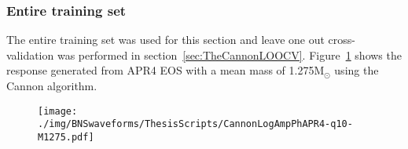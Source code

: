 \subsubsection{Entire training set}
\label{sec:TheCannonEntireTrainingSet}
The entire training set was used for this section and leave one out cross-validation was performed in section~\ref{sec:TheCannonLOOCV}. Figure~\ref{fig:CannonLogAmpPhAPR4-q10-M1275} shows the response generated from APR4 EOS with a mean mass of 1.275M$_\odot$ using the Cannon algorithm.
\begin{figure}[H]
	\texttt{[image: ./img/BNSwaveforms/ThesisScripts/CannonLogAmpPhAPR4-q10-M1275.pdf]} 
	\caption[\protect]{\protect}
	\label{fig:CannonLogAmpPhAPR4-q10-M1275}
\end{figure}

